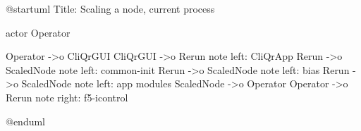 @startuml
Title: Scaling a node, current process

actor Operator

Operator ->o CliQrGUI
CliQrGUI ->o Rerun
note left: CliQrApp
Rerun ->o ScaledNode
note left: common-init
Rerun ->o ScaledNode
note left: bias
Rerun ->o ScaledNode
note left: app modules
ScaledNode ->o Operator
Operator ->o Rerun
note right: f5-icontrol


@enduml

